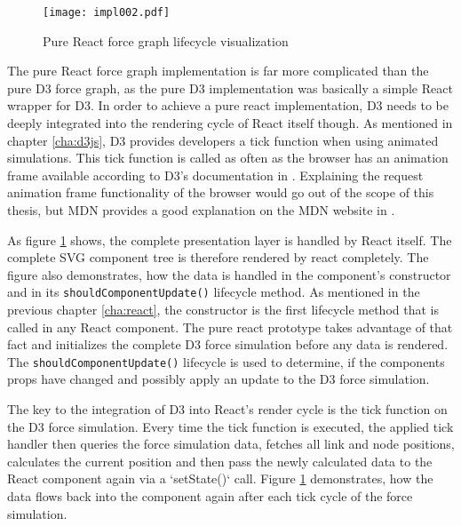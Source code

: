 \begin{figure}
\centering
\texttt{[image: impl002.pdf]}
\caption{Pure React force graph lifecycle visualization}
\label{fig:pureReactLifecycle}
\end{figure}

The pure React force graph implementation is far more complicated than the pure D3 force graph, as the pure D3 implementation was basically a simple React wrapper for D3. In order to achieve a pure react implementation, D3 needs to be deeply integrated into the rendering cycle of React itself though. As mentioned in chapter \ref{cha:d3js}, D3 provides developers a tick function when using animated simulations. This tick function is called as often as the browser has an animation frame available according to D3's documentation in \cite[/d3-timer/blob/master/README.md]{D3Github}. Explaining the request animation frame functionality of the browser would go out of the scope of this thesis, but MDN provides a good explanation on the MDN website in \cite{RAF}.

As figure \ref{fig:pureReactLifecycle} shows, the complete presentation layer is handled by React itself. The complete SVG component tree is therefore rendered by react completely. The figure also demonstrates, how the data is handled in the component's constructor and in its \texttt{shouldComponentUpdate()} lifecycle method. As mentioned in the previous chapter \ref{cha:react}, the constructor is the first lifecycle method that is called in any React component. The pure react prototype takes advantage of that fact and initializes the complete D3 force simulation before any data is rendered. The \texttt{shouldComponentUpdate()} lifecycle is used to determine, if the components props have changed and possibly apply an update to the D3 force simulation.

The key to the integration of D3 into React's render cycle is the tick function on the D3 force simulation. Every time the tick function is executed, the applied tick handler then queries the force simulation data, fetches all link and node positions, calculates the current position and then pass the newly calculated data to the React component again via a `setState()` call. Figure \ref{fig:pureReactLifecycle} demonstrates, how the data flows back into the component again after each tick cycle of the force simulation.

